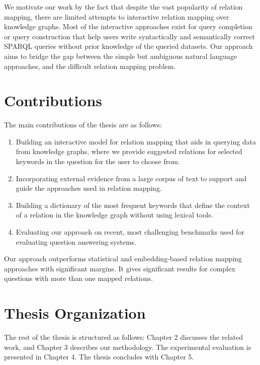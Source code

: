 \begin{sloppypar}
We motivate our work by the fact that despite the vast popularity of relation mapping, there are limited attempts to interactive relation mapping over knowledge graphs. Most of the interactive approaches exist for query completion or query construction that help users write syntactically and semantically correct SPARQL queries without prior knowledge of the queried datasets\cite{sapphire}. Our approach aims to bridge the gap between the simple but ambiguous natural language approaches, and the difficult relation mapping problem.

\section{Contributions}
The main contributions of the thesis are as follows:
\begin{enumerate}
\item Building an interactive model for relation mapping that aids in querying data from knowledge graphs, where we provide suggested relations for selected keywords in the question for the user to choose from.

\item  Incorporating external evidence from a large corpus of text to support and guide the approaches used in relation mapping.

\item Building a dictionary of the most frequent keywords that define the context of a relation in the knowledge graph without using lexical tools.

\item Evaluating our approach on recent, most challenging benchmarks used for evaluating question answering systems.

\end{enumerate}

Our approach outperforms statistical and embedding-based relation mapping approaches with significant margins. It gives significant results for complex questions with more than one mapped relations. 

\section{Thesis Organization}
The rest of the thesis is structured as follows: Chapter 2 discusses the related work, and Chapter 3 describes our methodology. The experimental evaluation is presented in Chapter 4. The thesis concludes with Chapter 5.
\end{sloppypar}
